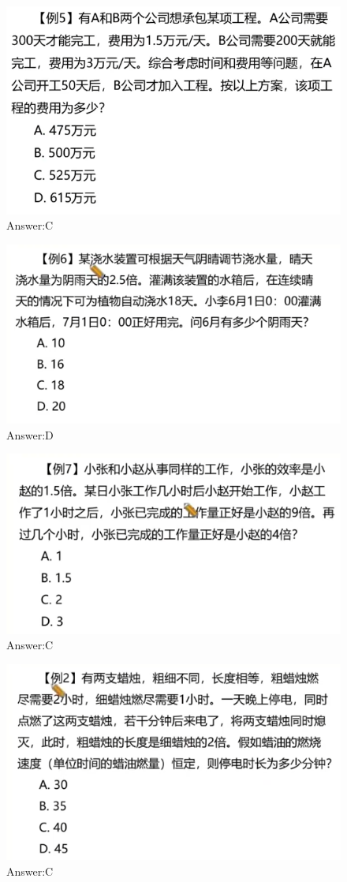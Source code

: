 \documentclass{article}
\numberwithin{equation}{section}						%
\numberwithin{figure}{section}							%
\begin{document}
\begin{sloppypar}
\begin{figure}[H]
     \centering
     \includegraphics[width=0.6\linewidth]{262.png}
		\caption{Answer:C}
\end{figure}


\begin{figure}[H]
     \centering
     \includegraphics[width=0.6\linewidth]{263.png}
		\caption{Answer:D}
\end{figure}



\begin{figure}[H]
     \centering
     \includegraphics[width=0.6\linewidth]{264.png}
		\caption{Answer:C}
\end{figure}



\begin{figure}[H]
     \centering
     \includegraphics[width=0.6\linewidth]{265.png}
		\caption{Answer:C}
\end{figure}



\end{sloppypar}
\end{document}
